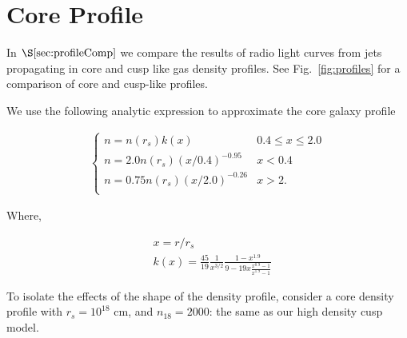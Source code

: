 \documentclass[usenatbib,fleqn]{mnras}
\begin{document}
\appendix
\section{Core Profile}
\label{app:core}
In $\S\ref{sec:profileComp}$ we compare the results of radio
light curves from jets propagating in core and cusp like gas density
profiles. See Fig.~\ref{fig:profiles} for a comparison of core and
cusp-like profiles. 

We use the following analytic expression to approximate the core
galaxy profile

\begin{align}
\begin{cases}
n=n(r_s) k(x) & 0.4 \leq x\leq 2.0\\
n = 2.0 n(r_s) (x/0.4)^{-0.95} & x < 0.4\\
n = 0.75 n(r_s) (x/2.0)^{-0.26} & x>2.\\
\end{cases}
\label{eq:cores}
\end{align}

Where, 

\begin{align}
  &x=r/r_s\\\nonumber
  &k(x)=\frac{45}{19} \frac{1}{x^{3/2}} \frac{1-x^{1.9}}{9-19
      x\frac{x^{0.9}-1}{x^{1.9}-1}}
\end{align}

To isolate the effects of the shape of the density profile, consider a
core density profile with $r_s=10^{18}$ cm, and $n_{18}=2000$: the
same as our high density cusp model.

\clearpage
  \footnotesize{
    
    
  }
\end{document}
